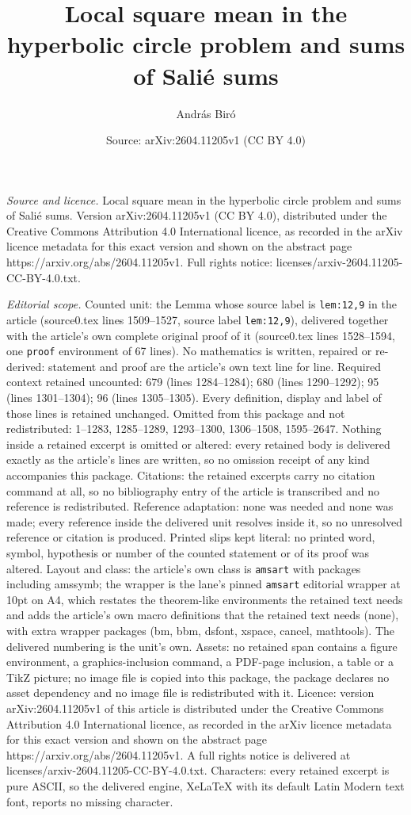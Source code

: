 \documentclass[10pt,a4paper]{amsart}
\title[Local square mean in the hyperbolic circle problem and sums ]{Local square mean in the hyperbolic circle problem and sums of Sali\'e sums}
\author{Andr\'as Bir\'o}
\date{Source: arXiv:2604.11205v1 (CC BY 4.0)}
\begin{document}
\maketitle

\noindent\emph{Source and licence.} Local square mean in the hyperbolic circle problem and sums of Sali\'e sums. Version arXiv:2604.11205v1 (CC BY 4.0), distributed under the Creative Commons Attribution 4.0 International licence, as recorded in the arXiv licence metadata for this exact version and shown on the abstract page https://arxiv.org/abs/2604.11205v1. Full rights notice: licenses/arxiv-2604.11205-CC-BY-4.0.txt.\par\smallskip

\noindent\textit{Editorial scope.} Counted unit: the Lemma whose source label is \texttt{lem:12,9} in the article (source0.tex lines 1509--1527, source label \texttt{lem:12,9}), delivered together with the article's own complete original proof of it (source0.tex lines 1528--1594, one \texttt{proof} environment of 67 lines). No mathematics is written, repaired or re-derived: statement and proof are the article's own text line for line. Required context retained uncounted: 679 (lines 1284--1284); 680 (lines 1290--1292); 95 (lines 1301--1304); 96 (lines 1305--1305). Every definition, display and label of those lines is retained unchanged. Omitted from this package and not redistributed: 1--1283, 1285--1289, 1293--1300, 1306--1508, 1595--2647. Nothing inside a retained excerpt is omitted or altered: every retained body is delivered exactly as the article's lines are written, so no omission receipt of any kind accompanies this package. Citations: the retained excerpts carry no citation command at all, so no bibliography entry of the article is transcribed and no reference is redistributed. Reference adaptation: none was needed and none was made; every reference inside the delivered unit resolves inside it, so no unresolved reference or citation is produced. Printed slips kept literal: no printed word, symbol, hypothesis or number of the counted statement or of its proof was altered. Layout and class: the article's own class is \texttt{amsart} with packages including amssymb; the wrapper is the lane's pinned \texttt{amsart} editorial wrapper at 10pt on A4, which restates the theorem-like environments the retained text needs and adds the article's own macro definitions that the retained text needs (none), with extra wrapper packages (bm, bbm, dsfont, xspace, cancel, mathtools). The delivered numbering is the unit's own. Assets: no retained span contains a figure environment, a graphics-inclusion command, a PDF-page inclusion, a table or a TikZ picture; no image file is copied into this package, the package declares no asset dependency and no image file is redistributed with it. Licence: version arXiv:2604.11205v1 of this article is distributed under the Creative Commons Attribution 4.0 International licence, as recorded in the arXiv licence metadata for this exact version and shown on the abstract page https://arxiv.org/abs/2604.11205v1. A full rights notice is delivered at licenses/arxiv-2604.11205-CC-BY-4.0.txt. Characters: every retained excerpt is pure ASCII, so the delivered engine, XeLaTeX with its default Latin Modern text font, reports no missing character.
\end{document}

